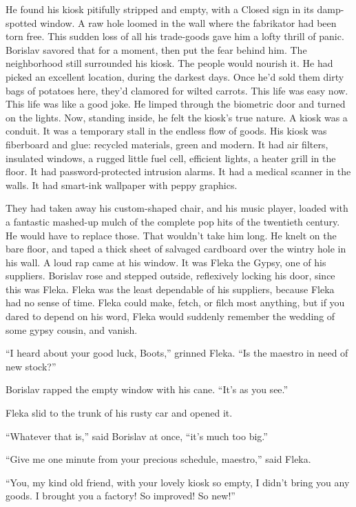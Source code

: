 \documentclass[20 pt,twoside,extrafontsizes,final]{memoir}
\begin{document}
He found his kiosk pitifully stripped and empty, with a Closed sign in its damp-spotted window. A raw hole loomed in the wall where the fabrikator had been torn free. This sudden loss of all his trade-goods gave him a lofty thrill of panic. Borislav savored that for a moment, then put the fear behind him. The neighborhood still surrounded his kiosk. The people would nourish it. He had picked an excellent location, during the darkest days. Once he'd sold them dirty bags of potatoes here, they'd clamored for wilted carrots. This life was easy now. This life was like a good joke.
He limped through the biometric door and turned on the lights. Now, standing inside, he felt the kiosk's true nature. A kiosk was a conduit. It was a temporary stall in the endless flow of goods. 
His kiosk was fiberboard and glue: recycled materials, green and modern. It had air filters, insulated windows, a rugged little fuel cell, efficient lights, a heater grill in the floor. It had password-protected intrusion alarms. It had a medical scanner in the walls. It had smart-ink wallpaper with peppy graphics.

They had taken away his custom-shaped chair, and his music player, loaded with a fantastic mashed-up mulch of the complete pop hits of the twentieth century. He would have to replace those. That wouldn't take him long. He knelt on the bare floor, and taped a thick sheet of salvaged cardboard over the wintry hole in his wall. A loud rap came at his window. It was Fleka the Gypsy, one of his suppliers. Borislav rose and stepped outside, reflexively locking his door, since this was Fleka. Fleka was the least dependable of his suppliers, because Fleka had no sense of time. Fleka could make, fetch, or filch most anything, but if you dared to depend on his word, Fleka would suddenly remember the wedding of some gypsy cousin, and vanish.

 ``I heard about your good luck, Boots,'' grinned Fleka. ``Is the maestro in need of new stock?'' 
 
Borislav rapped the empty window with his cane. ``It's as you see.''

Fleka slid to the trunk of his rusty car and opened it.

``Whatever that is,'' said Borislav at once, ``it's much too big.''

``Give me one minute from your precious schedule, maestro,'' said Fleka.

``You, my kind old friend, with your lovely kiosk so empty, I didn't bring you any goods. I brought you a factory! So improved! So new!''
\end{document}
